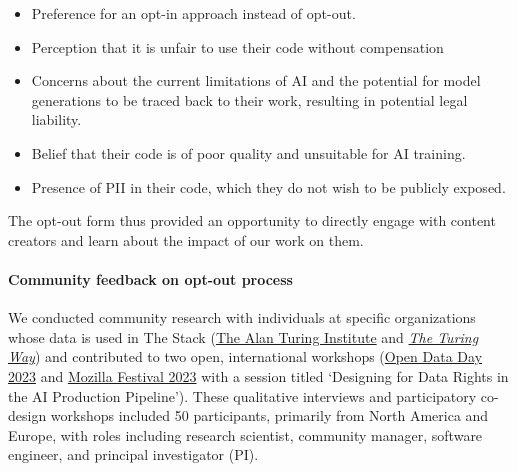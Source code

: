 \begin{itemize}
    \item Preference for an opt-in approach instead of opt-out.
    \item Perception that it is unfair to use their code without compensation \item Concerns about the current limitations of AI and the potential for model generations to be traced back to their work, resulting in potential legal liability.
    \item Belief that their code is of poor quality and unsuitable for AI training.
    \item Presence of PII in their code, which they do not wish to be publicly exposed.
\end{itemize}

The opt-out form thus provided an opportunity to directly engage with content creators and learn about the impact of our work on them.  

\paragraph{Community feedback on opt-out process} We conducted community research with individuals at specific organizations whose data is used in The Stack (\href{https://turing.ac.uk/}{The Alan Turing Institute} and \emph{\href{https://the-turing-way.netlify.app/}{The Turing Way}}) and contributed to two open, international workshops (\href{https://opendataday.org/events/2023/#designing-for-data-rights-in-the-ai-production-pipeline}{Open Data Day 2023} and \href{https://schedule.mozillafestival.org/session/KAS9YF-1}{Mozilla Festival 2023} with a session titled ‘Designing for Data Rights in the AI Production Pipeline’). These qualitative interviews and participatory co-design workshops included 50 participants, primarily from North America and Europe, with roles including research scientist, community manager, software engineer, and principal investigator (PI).

